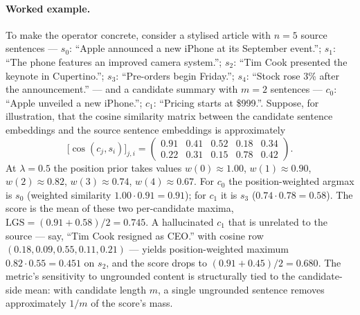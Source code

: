 \documentclass[journal]{IEEEtran}
\begin{document}
\paragraph{Worked example.}
To make the operator concrete, consider a stylised article with
$n{=}5$ source sentences --- $s_0$: ``Apple announced a new
iPhone at its September event.''; $s_1$: ``The phone features an
improved camera system.''; $s_2$: ``Tim Cook presented the
keynote in Cupertino.''; $s_3$: ``Pre-orders begin Friday.'';
$s_4$: ``Stock rose 3\% after the announcement.'' --- and a
candidate summary with $m{=}2$ sentences --- $c_0$: ``Apple
unveiled a new iPhone.''; $c_1$: ``Pricing starts at \$999.''.
Suppose, for illustration, that the cosine similarity matrix
between the candidate sentence embeddings and the source
sentence embeddings is approximately
\[
\bigl[\cos(c_j, s_i)\bigr]_{j,i} =
\begin{pmatrix}
0.91 & 0.41 & 0.52 & 0.18 & 0.34 \\
0.22 & 0.31 & 0.15 & 0.78 & 0.42
\end{pmatrix}.
\]
At $\lambda{=}0.5$ the position prior takes values
$w(0){\approx}1.00$, $w(1){\approx}0.90$, $w(2){\approx}0.82$,
$w(3){\approx}0.74$, $w(4){\approx}0.67$. For $c_0$ the
position-weighted argmax is $s_0$ (weighted similarity
$1.00{\cdot}0.91{=}0.91$); for $c_1$ it is $s_3$
($0.74{\cdot}0.78{=}0.58$). The score is the mean of these
two per-candidate maxima, $\mathrm{LGS}{=}(0.91{+}0.58)/2{=}0.745$.
A hallucinated $c_1$ that is unrelated to the source --- say,
``Tim Cook resigned as CEO.'' with cosine row
$(0.18, 0.09, 0.55, 0.11, 0.21)$ --- yields position-weighted
maximum $0.82{\cdot}0.55{=}0.451$ on $s_2$, and the score drops
to $(0.91{+}0.45)/2{=}0.680$. The metric's sensitivity to
ungrounded content is structurally tied to the candidate-side
mean: with candidate length $m$, a single ungrounded sentence
removes approximately $1/m$ of the score's mass.
\end{document}
